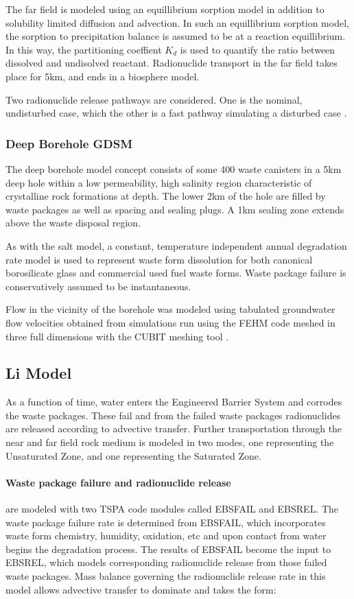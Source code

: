 {The far field is modeled using an equillibrium sorption model in addition 
to solubility limited diffusion and advection. In such an equillibrium sorption 
model, the sorption to precipitation balance is assumed to be at a 
reaction equillibrium. In this way, the partitioning coeffient $K_d$ is used to 
quantify the ratio between dissolved and undisolved reactant. Radionuclide transport
in the far field takes place for 5km, and ends in a biosphere model. 

Two radionuclide release pathways are considered. One is the nominal, undisturbed 
case, which the other is a fast pathway simulating a disturbed case
\cite{clayton_generic_2011}.


\subsubsection{ Deep Borehole GDSM}

The deep borehole model concept consists of some 400 waste canisters in a 5km 
deep hole within a low permeability, high salinity region characteristic of 
crystalline rock formations at depth. The lower 2km of the hole are filled 
by waste packages as well as spacing and sealing plugs. A 1km sealing zone 
extends above the waste disposal region.

As with the salt model, a constant, temperature independent annual degradation
rate model is used to represent waste form dissolution for both canonical 
borosilicate glass and commercial used fuel waste forms. Waste package failure 
is conservatively assumed to be instantaneous.

Flow in the vicinity of the borehole was modeled using tabulated groundwater 
flow velocities obtained from simulations run using the \gls{FEHM} code 
meshed in three full dimensions with the \gls{CUBIT} meshing tool 
\cite{clayton_generic_2011}.
\subsection{Li Model\cite{li_methodology_2006}} As a function of time, water
enters the Engineered Barrier System and corrodes the waste packages.  These
fail and from the failed waste packages radionuclides are released according to
advective transfer.  Further transportation through the near and far field rock
medium is modeled in two modes, one representing the Unsaturated Zone, and one
representing the Saturated Zone.

\paragraph{Waste package failure and radionuclide release} are modeled with two TSPA
code modules called EBSFAIL and EBSREL. The waste package failure rate is
determined from EBSFAIL, which incorporates waste form chemistry, humidity,
oxidation, etc and upon contact from water begins the degradation process. The
results of EBSFAIL become the input to EBSREL, which models corresponding
radionuclide release from those failed waste packages. Mass balance governing the
radionuclide release rate in this model allows advective transfer to dominate and
takes the form:

}
